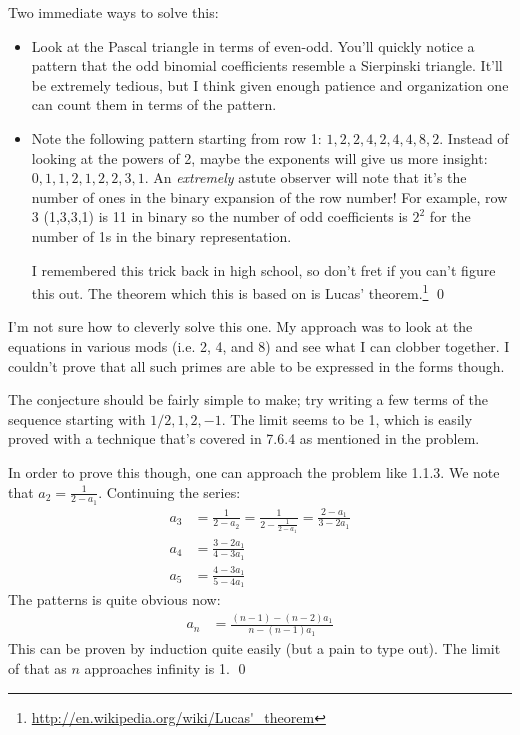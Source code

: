 \begin{Exercise}
Two immediate ways to solve this: 
\begin{itemize}
	\item Look at the Pascal triangle in terms of even-odd. You'll quickly notice a pattern that the odd binomial
	coefficients resemble a Sierpinski triangle. It'll be extremely tedious, but I think given enough patience and
	organization one can count them in terms of the pattern.
	\item Note the following pattern starting from row 1: $1,2,2,4,2,4,4,8,2$. Instead of looking at the powers of 2,
	maybe the exponents will give us more insight: $0,1,1,2,1,2,2,3,1$. An \emph{extremely} astute observer will
	note that it's the number of ones in the binary expansion of the row number! For example, row 3 (1,3,3,1) is 11 in 
	binary so the number of odd coefficients is $2^2$ for the number of 1s in the binary representation. 

	I remembered this trick back in high school, so don't fret if you can't figure this out. The theorem which this is based
	on is Lucas' theorem.\footnote{\url{http://en.wikipedia.org/wiki/Lucas'\_theorem}} \qed
\end{itemize}
\end{Exercise}

\begin{Exercise}
	I'm not sure how to cleverly solve this one. My approach was to look at the equations in various mods (i.e. 2, 4, and 8) 
	and see what I can clobber together. I couldn't prove that all such primes are able to be expressed in the forms though.
\end{Exercise}

\begin{Exercise}
	The conjecture should be fairly simple to make; try writing a few terms of the sequence starting with $1/2, 1, 2, -1$. 
	The limit seems to be 1, which is easily proved with a technique that's covered in 7.6.4 as mentioned in the problem. 

	In order to prove this though, one can approach the problem like 1.1.3. We note that $a_2 = \frac{1}{2-a_1}$. 
	Continuing the series:
	\begin{align}
		a_3 &= \frac{1}{2-a_2} = \frac{1}{2 - \frac{1}{2-a_1}} = \frac{2-a_1}{3-2a_1} \\
		a_4 &= \frac{3-2a_1}{4-3a_1} \\
		a_5 &= \frac{4-3a_1}{5-4a_1}
	\end{align}
	The patterns is quite obvious now: 
	\begin{align}
		a_n &= \frac{(n-1) - (n-2)a_1}{n - (n-1)a_1}
	\end{align}
	This can be proven by induction quite easily (but a pain to type out). The limit of that as $n$ approaches infinity
	is 1. \qed
\end{Exercise}

